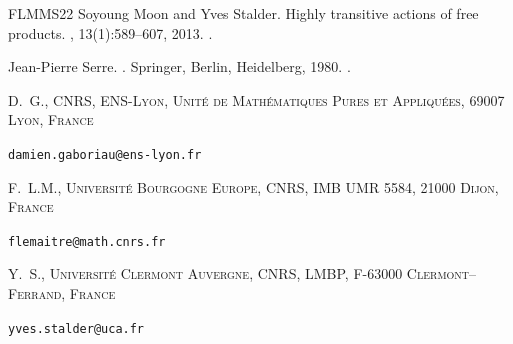 \documentclass[12pt]{article}
\numberwithin{equation}{section}
\theoremstyle{definition}
\begin{document}
\begin{thebibliography}{FLMMS22}
Soyoung Moon and Yves Stalder.
\newblock Highly transitive actions of free products.
, 13(1):589--607, 2013.
\newblock \href {https://doi.org/10.2140/agt.2013.13.589}
  {}.

Jean-Pierre Serre.
.
\newblock Springer, Berlin, Heidelberg, 1980.
\newblock \href {https://doi.org/10.1007/978-3-642-61856-7}
  {}.

\end{thebibliography}



\bigskip
{\footnotesize
	
	\noindent
	{D.~G., \textsc{CNRS, ENS-Lyon, 
			Unité de Mathématiques Pures et Appliquées,  69007 Lyon, France}}
	\par\nopagebreak \texttt{damien.gaboriau@ens-lyon.fr}
	
	\medskip
 

	\noindent
	{F.~L.M., \textsc{Université Bourgogne Europe, CNRS, IMB UMR 5584, 21000 Dijon, France}}
	\par\nopagebreak \texttt{flemaitre@math.cnrs.fr}
	
	\medskip
	
	\noindent
	{Y.~S., \textsc{Université Clermont Auvergne, CNRS, LMBP, F-63000 Clermont–Ferrand, France}}
	\par\nopagebreak \texttt{yves.stalder@uca.fr}
}
\end{document}
